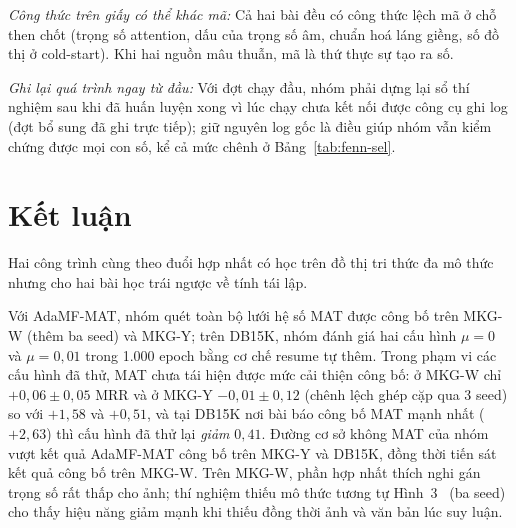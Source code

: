 \documentclass[conference]{IEEEtran}
\begin{document}
\textit{Công thức trên giấy có thể khác mã:} Cả hai bài đều có công thức lệch mã ở chỗ then chốt
(trọng số attention, dấu của trọng số âm, chuẩn hoá láng giềng, số đồ thị ở cold-start). Khi hai
nguồn mâu thuẫn, mã là thứ thực sự tạo ra số.

\textit{Ghi lại quá trình ngay từ đầu:} Với đợt chạy đầu, nhóm phải dựng lại sổ thí nghiệm sau khi
đã huấn luyện xong vì lúc chạy chưa kết nối được công cụ ghi log (đợt bổ sung đã ghi trực tiếp); giữ nguyên log gốc là điều giúp nhóm vẫn kiểm chứng
được mọi con số, kể cả mức chênh ở Bảng~\ref{tab:fenn-sel}.

\section{Kết luận}

Hai công trình cùng theo đuổi hợp nhất có học trên đồ thị tri thức đa mô thức
nhưng cho hai bài học trái ngược về tính tái lập.

Với AdaMF-MAT, nhóm quét toàn bộ lưới hệ số MAT được công bố trên MKG-W (thêm ba seed) và
MKG-Y; trên DB15K, nhóm đánh giá hai cấu hình $\mu=0$ và $\mu=0{,}01$ trong 1.000 epoch bằng cơ
chế resume tự thêm. Trong phạm vi các cấu hình đã thử, MAT chưa tái hiện được mức cải thiện công bố: ở
MKG-W chỉ $+0{,}06 \pm 0{,}05$ MRR và ở MKG-Y $-0{,}01 \pm 0{,}12$ (chênh lệch ghép cặp qua 3 seed) so với $+1{,}58$ và $+0{,}51$, và tại DB15K
nơi bài báo công bố MAT mạnh nhất ($+2{,}63$) thì cấu hình đã thử lại \emph{giảm} $0{,}41$. Đường cơ
sở không MAT của nhóm vượt kết quả AdaMF-MAT công bố trên MKG-Y và DB15K, đồng thời tiến sát kết
quả công bố trên MKG-W. Trên MKG-W, phần hợp nhất thích nghi gán trọng số rất thấp cho ảnh; thí nghiệm thiếu mô thức tương
tự Hình~3~\cite{adamfmat} (ba seed) cho thấy hiệu năng giảm mạnh khi thiếu đồng thời ảnh và văn bản lúc suy luận.
\end{document}
